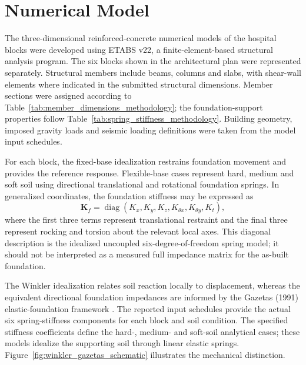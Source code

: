 \section{Numerical Model}
The three-dimensional reinforced-concrete numerical models of the hospital blocks were developed using ETABS v22, a finite-element-based structural analysis program. The six blocks shown in the architectural plan were represented separately. Structural members include beams, columns and slabs, with shear-wall elements where indicated in the submitted structural dimensions. Member sections were assigned according to Table~\ref{tab:member_dimensions_methodology}; the foundation-support properties follow Table~\ref{tab:spring_stiffness_methodology}. Building geometry, imposed gravity loads and seismic loading definitions were taken from the model input schedules.

For each block, the fixed-base idealization restrains foundation movement and provides the reference response. Flexible-base cases represent hard, medium and soft soil using directional translational and rotational foundation springs. In generalized coordinates, the foundation stiffness may be expressed as
\begin{equation}
\mathbf{K}_f=\operatorname{diag}(K_x,K_y,K_z,K_{\theta x},K_{\theta y},K_t),
\label{eq:foundation_six_dof}
\end{equation}
where the first three terms represent translational restraint and the final three represent rocking and torsion about the relevant local axes. This diagonal description is the idealized uncoupled six-degree-of-freedom spring model; it should not be interpreted as a measured full impedance matrix for the as-built foundation.

The Winkler idealization relates soil reaction locally to displacement, whereas the equivalent directional foundation impedances are informed by the Gazetas (1991) elastic-foundation framework \cite{wolf1985,gazetas1991}. The reported input schedules provide the actual six spring-stiffness components for each block and soil condition. The specified stiffness coefficients define the hard-, medium- and soft-soil analytical cases; these models idealize the supporting soil through linear elastic springs. Figure~\ref{fig:winkler_gazetas_schematic} illustrates the mechanical distinction.

